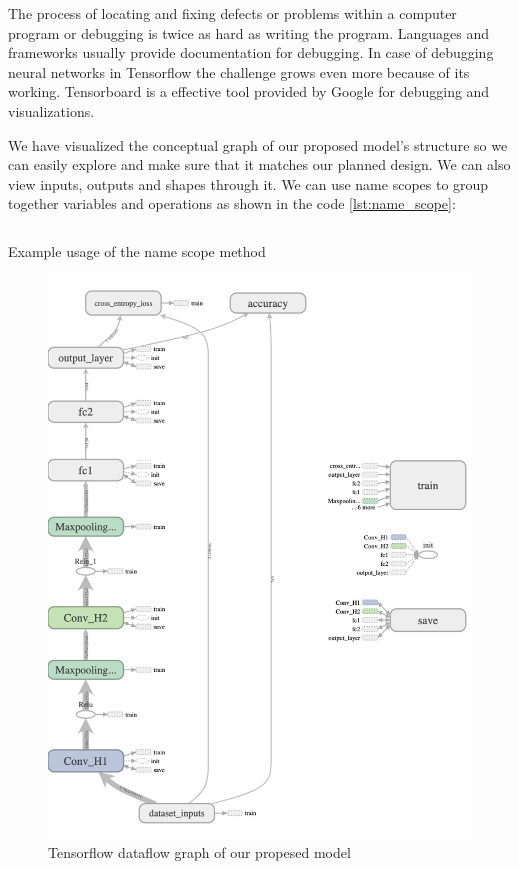 The process of locating and fixing defects or problems within a computer program or debugging is twice as hard as writing the program. Languages and frameworks usually provide documentation for debugging. In case of debugging neural networks in Tensorflow the challenge grows even more because of its working. Tensorboard is a effective tool provided by Google for debugging and visualizations.

We have visualized the conceptual graph of our proposed model's structure so we can easily explore and make sure that it matches our planned design. We can also view inputs, outputs and shapes through it. We can use name scopes to group together variables and operations as shown in the code \ref{lst:name_scope}:
\par
\begin{listing}
  \inputminted[frame=lines,framesep=2mm,baselinestretch=1.2,fontsize=\scriptsize,linenos]{python}{Chapter5/name_scope.py}
  \caption{Example usage of the name scope method}
  \label{lst:name_scope}
\end{listing}

\begin{figure}[H]
  \centering
  \includegraphics[scale=0.40]{images/Chapter5/graph.png}
  \caption{Tensorflow dataflow graph of our propesed model}
  \label{fig:graph}
\end{figure}

